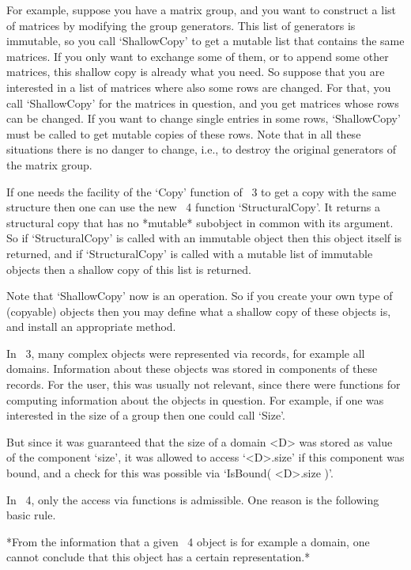 For example, suppose you have a matrix group, and you want to construct
a list of matrices by modifying the group generators.
This list of generators is immutable, so you call `ShallowCopy' to get a
mutable list that contains the same matrices.
If you only want to exchange some of them, or to append some
other matrices, this shallow copy is already what you need.
So suppose that you are interested in a list of matrices where also
some rows are changed.  For that, you call `ShallowCopy' for the matrices
in question, and you get matrices whose rows can be changed.
If you want to change single entries in some rows,
`ShallowCopy' must be called to get mutable copies of these rows.
Note that in all these situations there is no danger to change, i.e.,
to destroy the original generators of the matrix group.

If one needs the facility of the `Copy' function of {\GAP}~3 to get a
copy with the same structure then one can use the new {\GAP}~4 function
`StructuralCopy'.
It returns a structural copy that has no *mutable* subobject in common
with its argument.
So if `StructuralCopy' is called with an immutable object then this
object itself is returned,
and if `StructuralCopy' is called with a mutable list of immutable
objects then a shallow copy of this list is returned.

Note that `ShallowCopy' now is an operation.
So if you create your own type of (copyable) objects then you may define
what a shallow copy of these objects is,
and install an appropriate method.



In {\GAP}~3, many complex objects were represented via records,
for example all domains.
Information about these objects was stored in components of these
records.
For the user, this was usually not relevant, since there were functions
for computing information about the objects in question.
For example, if one was interested in the size of a group then one could
call `Size'.

But since it was guaranteed that the size of a domain <D> was stored as
value of the component `size', it was allowed to access `<D>.size'
if this component was bound, and a check for this was possible via
`IsBound( <D>.size )'.

In {\GAP}~4, only the access via functions is admissible.
One reason is the following basic rule.

*From the information that a given {\GAP}~4 object is for example a
domain, one cannot conclude that this object has a certain
representation.*

